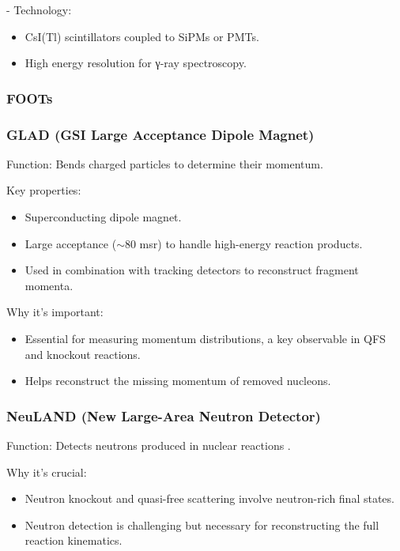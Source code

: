 - Technology:

\begin{itemize}
	\item CsI(Tl) scintillators coupled to SiPMs or PMTs.
	\item High energy resolution for γ-ray spectroscopy.
\end{itemize}


\subsubsection{FOOTs}

\subsubsection{GLAD (GSI Large Acceptance Dipole Magnet)}

Function: Bends charged particles to determine their momentum.

Key properties:

\begin{itemize}
	\item Superconducting dipole magnet.
	\item Large acceptance ($\sim$80 msr) to handle high-energy reaction products.
	\item Used in combination with tracking detectors to reconstruct fragment momenta.
\end{itemize}

Why it’s important:

\begin{itemize}
	\item Essential for measuring momentum distributions, a key observable in QFS and knockout reactions.
	\item Helps reconstruct the missing momentum of removed nucleons.
\end{itemize}


\subsubsection{NeuLAND (New Large-Area Neutron Detector)}

Function: Detects neutrons produced in nuclear reactions \cite{boretzky_neuland_2021}.

Why it's crucial:

\begin{itemize}
	\item Neutron knockout and quasi-free scattering involve neutron-rich final states.
	\item Neutron detection is challenging but necessary for reconstructing the full reaction kinematics.
\end{itemize}


